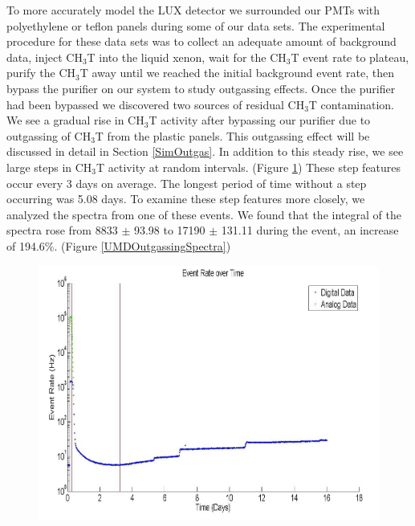 \documentclass[a4paper,12pt]{article}
\begin{document}
{To more accurately model the LUX detector we surrounded our PMTs with polyethylene or teflon panels during some of our data sets. The experimental procedure for these data sets was to collect an adequate amount of background data, inject CH$_3$T into the liquid xenon, wait for the CH$_3$T event rate to plateau, purify the CH$_3$T away until we reached the initial background event rate, then bypass the purifier on our system to study outgassing effects. Once the purifier had been bypassed we discovered two sources of residual CH$_3$T contamination. We see a gradual rise in CH$_3$T activity after bypassing our purifier due to outgassing of CH$_3$T from the plastic panels.  This outgassing effect will be discussed in detail in Section \ref{SimOutgas}. In addition to this steady rise, we see large steps in CH$_3$T activity at random intervals. (Figure \ref{UMDOutgassing}) These step features occur every 3 days on average. The longest period of time without a step occurring was 5.08 days. To examine these step features more closely, we analyzed the spectra from one of these events. We found that the integral of the spectra rose from 8833 $\pm$ 93.98 to 17190 $\pm$ 131.11 during the event, an increase of 194.6\%. (Figure \ref{UMDOutgassingSpectra})

\begin{figure}
\includegraphics[scale=.35]{Outgassing_TimeHisto_Log.jpg} 
\label{UMDOutgassing}
\end{figure}

}
\end{document}
